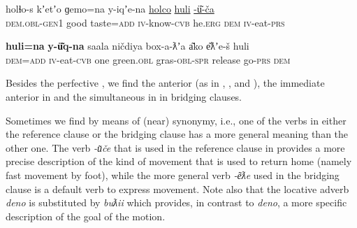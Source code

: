 \documentclass[output=paper]{LSP/langsci}
\begin{document}
\clearpage
\begin{exe}
	\ex	\label{ex:13ab} 
	\begin{xlist}
		\ex	\label{ex:13a}
		\gll	holɬo-s     		kʼetʼo 	ɡemo=na   	y-iqʼe-na  			\underline{holco}  	\underline{huli}   \underline{-ü͂-ča}\\
			\textsc{dem.obl-gen1} 	good     taste=\textsc{add}  	\textsc{iv}-know-\textsc{cvb} 	he.\textsc{erg}	\textsc{dem} 	\textsc{iv}-eat-\textsc{prs}\\
		\glt	{}

		\ex	\label{ex:13b}
		\gll			\textbf{huli=na}   	\textbf{y-ü͂q-na}  	saala 	ničdiya 		box-a-ƛʼa 		a͂ko e͂ƛʼe-š 	huli \\
			\textsc{dem=add}  	\textsc{iv}-eat-\textsc{cvb} 	one   	green.\textsc{obl} 	gras-\textsc{obl-spr} 	release go-\textsc{prs} 	\textsc{dem}  \\
		\glt	{}
	\end{xlist}
\end{exe}

Besides the perfective , we find the anterior  (as in , , and ), the immediate anterior  in  and the simultaneous  in  in bridging clauses. 

Sometimes we find  by means of (near) synonymy, i.e., one of the verbs in either the reference clause or the bridging clause has a more general meaning than the other one. The verb \textit{-u͂če}  that is used in the reference clause in  provides a more precise description  of the kind of movement that is used to return home (namely fast movement by foot), while the more general verb  \textit{-e͂ƛe}  used in the bridging clause is a default verb to express movement. Note also that the locative adverb \textit{deno}  is substituted by \textit{buƛii}  which provides, in contrast to \textit{deno}, a more specific description of the goal of the motion. 
\end{document}
